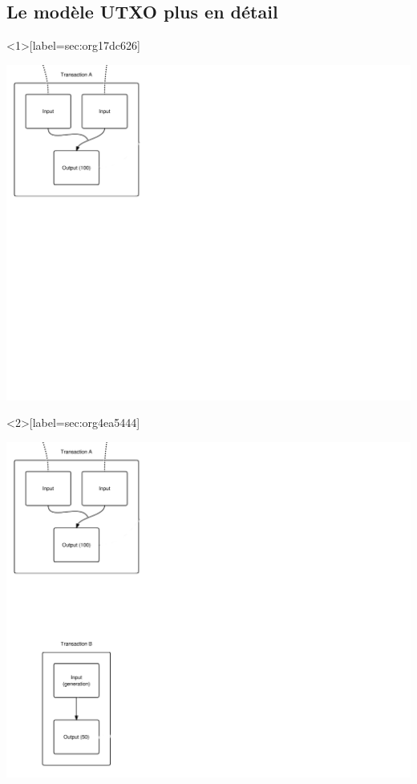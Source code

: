 \documentclass[presentation]{beamer}
\begin{document}
\subsection{Le modèle UTXO plus en détail}
\label{sec:org66f2568}
\begin{frame}<1>[label={sec:org17dc626}]{}
\begin{center}
\includegraphics[width=.9\textwidth]{Images/Transaction1.png}
\end{center}
\end{frame}
\begin{frame}<2>[label={sec:org4ea5444}]{}
\begin{center}
\includegraphics[width=.9\textwidth]{Images/Transaction2.png}
\end{center}
\end{frame}
\end{document}
